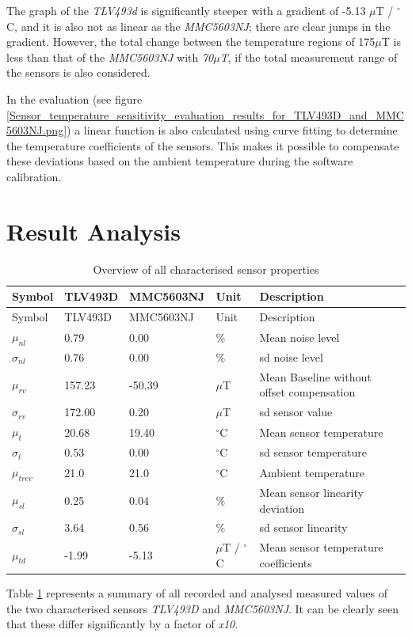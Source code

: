 The graph of the \emph{TLV493d} is significantly steeper with a gradient
of -5.13 \(\mu\)T / \(^{\circ}\)C, and it is also not as linear as the
\emph{MMC5603NJ}; there are clear jumps in the gradient. However, the
total change between the temperature regions of 175\(\mu\)T is less than
that of the \emph{MMC5603NJ} with \emph{70\(\mu\)T}, if the total
measurement range of the sensors is also considered.

In the evaluation (see figure
\ref{Sensor_temperature_sensitivity_evaluation_results_for_TLV493D_and_MMC5603NJ.png})
a linear function is also calculated using curve fitting to determine
the temperature coefficients of the sensors. This makes it possible to
compensate these deviations based on the ambient temperature during the
software calibration.

\hypertarget{result-analysis-1}{%
\section{Result Analysis}\label{result-analysis-1}}

\begin{longtable}[]{@{}lllll@{}}
\caption{Overview of all characterised sensor properties
\label{Overview_of_all_characterised_sensor_properties.csv}}\tabularnewline
\toprule
Symbol & TLV493D & MMC5603NJ & Unit & Description\tabularnewline
\midrule
\endfirsthead
\toprule
Symbol & TLV493D & MMC5603NJ & Unit & Description\tabularnewline
\midrule
\endhead
\(\mu_{nl}\) & 0.79 & 0.00 & \% & Mean noise level\tabularnewline
\(\sigma_{nl}\) & 0.76 & 0.00 & \% & \gls{sd} noise level\tabularnewline
\(\mu_{rv}\) & 157.23 & -50.39 & \(\mu\)T & Mean Baseline without offset
compensation\tabularnewline
\(\sigma_{rv}\) & 172.00 & 0.20 & \(\mu\)T & \gls{sd} sensor
value\tabularnewline
\(\mu_{t}\) & 20.68 & 19.40 & \(^{\circ}\)C & Mean sensor
temperature\tabularnewline
\(\sigma_{t}\) & 0.53 & 0.00 & \(^{\circ}\)C & \gls{sd} sensor
temperature\tabularnewline
\(\mu_{trev}\) & 21.0 & 21.0 & \(^{\circ}\)C & Ambient
temperature\tabularnewline
\(\mu_{sl}\) & 0.25 & 0.04 & \% & Mean sensor linearity
deviation\tabularnewline
\(\sigma_{sl}\) & 3.64 & 0.56 & \% & \gls{sd} sensor
linearity\tabularnewline
\(\mu_{td}\) & -1.99 & -5.13 & \(\mu\)T / \(^{\circ}\)C & Mean sensor
temperature coefficients\tabularnewline
\bottomrule
\end{longtable}

Table \ref{Overview_of_all_characterised_sensor_properties.csv}
represents a summary of all recorded and analysed measured values of the
two characterised sensors \emph{TLV493D} and \emph{MMC5603NJ}. It can be
clearly seen that these differ significantly by a factor of \emph{x10}.

